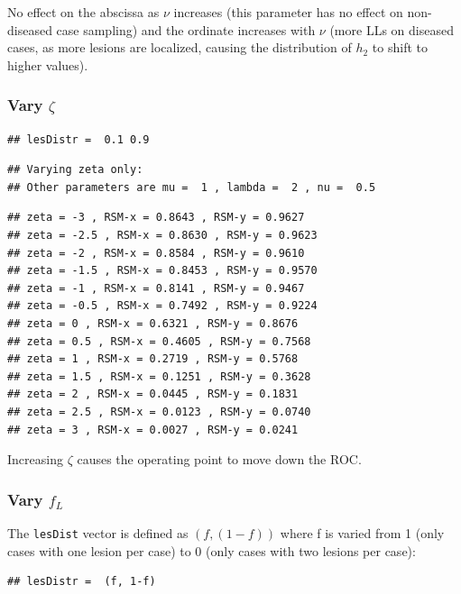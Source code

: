 \documentclass[
]{book}
\begin{document}
No effect on the abscissa as \(\nu\) increases (this parameter has no effect on non-diseased case sampling) and the ordinate increases with \(\nu\) (more LLs on diseased cases, as more lesions are localized, causing the distribution of \(h_2\) to shift to higher values).

\hypertarget{vary-zeta}{%
\subsubsection{\texorpdfstring{Vary \(\zeta\)}{Vary \textbackslash zeta}}\label{vary-zeta}}

\begin{verbatim}
## lesDistr =  0.1 0.9
\end{verbatim}

\begin{verbatim}
## Varying zeta only: 
## Other parameters are mu =  1 , lambda =  2 , nu =  0.5
\end{verbatim}

\begin{verbatim}
## zeta = -3 , RSM-x = 0.8643 , RSM-y = 0.9627 
## zeta = -2.5 , RSM-x = 0.8630 , RSM-y = 0.9623 
## zeta = -2 , RSM-x = 0.8584 , RSM-y = 0.9610 
## zeta = -1.5 , RSM-x = 0.8453 , RSM-y = 0.9570 
## zeta = -1 , RSM-x = 0.8141 , RSM-y = 0.9467 
## zeta = -0.5 , RSM-x = 0.7492 , RSM-y = 0.9224 
## zeta = 0 , RSM-x = 0.6321 , RSM-y = 0.8676 
## zeta = 0.5 , RSM-x = 0.4605 , RSM-y = 0.7568 
## zeta = 1 , RSM-x = 0.2719 , RSM-y = 0.5768 
## zeta = 1.5 , RSM-x = 0.1251 , RSM-y = 0.3628 
## zeta = 2 , RSM-x = 0.0445 , RSM-y = 0.1831 
## zeta = 2.5 , RSM-x = 0.0123 , RSM-y = 0.0740 
## zeta = 3 , RSM-x = 0.0027 , RSM-y = 0.0241
\end{verbatim}

Increasing \(\zeta\) causes the operating point to move down the ROC.

\hypertarget{vary-f_l}{%
\subsubsection{\texorpdfstring{Vary \(f_L\)}{Vary f\_L}}\label{vary-f_l}}

The \texttt{lesDist} vector is defined as \((f, (1-f))\) where f is varied from 1 (only cases with one lesion per case) to 0 (only cases with two lesions per case):

\begin{verbatim}
## lesDistr =  (f, 1-f)
\end{verbatim}
\end{document}
